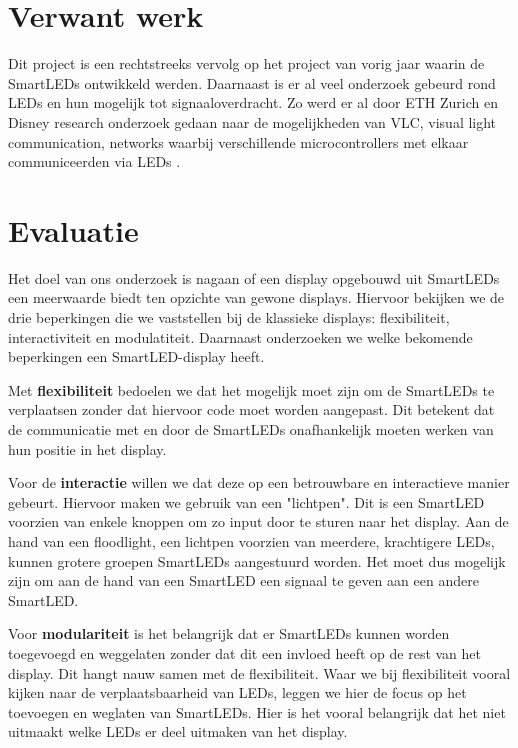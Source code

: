 \documentclass{article}
\begin{document}
\section{Verwant werk}
Dit project is een rechtstreeks vervolg op het project van vorig jaar waarin de SmartLEDs ontwikkeld werden. \cite{smartLED}
Daarnaast is er al veel onderzoek gebeurd rond LEDs en hun mogelijk tot signaaloverdracht. Zo werd er al door ETH Zurich en Disney research onderzoek gedaan naar de mogelijkheden van VLC, visual light communication, networks waarbij verschillende microcontrollers met elkaar communiceerden via LEDs \cite{VLCNetworks}.



\section{Evaluatie}

Het doel van ons onderzoek is nagaan of een display opgebouwd uit SmartLEDs een meerwaarde biedt ten opzichte van gewone displays. Hiervoor bekijken we de drie beperkingen die we vaststellen bij de klassieke displays: flexibiliteit, interactiviteit en modulatiteit. Daarnaast onderzoeken we welke bekomende beperkingen een SmartLED-display heeft.

Met \textbf{flexibiliteit} bedoelen we dat het mogelijk moet zijn om de SmartLEDs te verplaatsen zonder dat hiervoor code moet worden aangepast. Dit betekent dat de communicatie met en door de SmartLEDs onafhankelijk moeten werken van hun positie in het display. 

Voor de \textbf{interactie} willen we dat deze op een betrouwbare en interactieve manier gebeurt. Hiervoor maken we gebruik van een "lichtpen". Dit is een SmartLED voorzien van enkele knoppen om zo input door te sturen naar het display. Aan de hand van een floodlight, een lichtpen voorzien van meerdere, krachtigere LEDs, kunnen grotere groepen SmartLEDs aangestuurd worden. Het moet dus mogelijk zijn om aan de hand van een SmartLED een signaal te geven aan een andere SmartLED.

Voor \textbf{modulariteit} is het belangrijk dat er SmartLEDs kunnen worden toegevoegd en weggelaten zonder dat dit een invloed heeft op de rest van het display. Dit hangt nauw samen met de flexibiliteit. Waar we bij flexibiliteit vooral kijken naar de verplaatsbaarheid van LEDs, leggen we hier de focus op het toevoegen en weglaten van SmartLEDs. Hier is het vooral belangrijk dat het niet uitmaakt welke LEDs er deel uitmaken van het display. 
\end{document}
